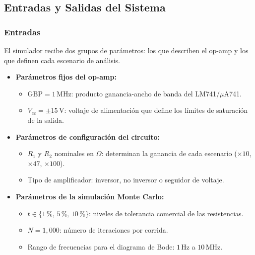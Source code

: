 ﻿\documentclass[12pt, letterpaper]{article}
\begin{document}
\subsection{Entradas y Salidas del Sistema}

\subsubsection*{Entradas}

El simulador recibe dos grupos de parámetros: los que describen el op-amp y los
que definen cada escenario de análisis.

\begin{itemize}[leftmargin=2em]

    \item \textbf{Parámetros fijos del op-amp:}
          \begin{itemize}[leftmargin=2em]
              \item \(\mathrm{GBP} = 1\,\text{MHz}\): producto ganancia-ancho de
                    banda del LM741/\(\mu\)A741. %
              \item \(V_{cc} = \pm15\,\text{V}\): voltaje de alimentación que
                    define los límites de saturación de la salida.
          \end{itemize}

    \item \textbf{Parámetros de configuración del circuito:}
          \begin{itemize}[leftmargin=2em]
              \item \(R_1\) y \(R_2\) nominales en \(\Omega\): determinan la
                    ganancia de cada escenario (\(\times 10\), \(\times 47\),
                    \(\times 100\)).
              \item Tipo de amplificador: inversor, no inversor o seguidor de
                    voltaje.
          \end{itemize}

    \item \textbf{Parámetros de la simulación Monte Carlo:}
          \begin{itemize}[leftmargin=2em]
              \item \(t \in \{1\,\text{\%},\, 5\,\text{\%},\, 10\,\text{\%}\}\): niveles de tolerancia
                    comercial de las resistencias.
              \item \(N = 1{,}000\): número de iteraciones por corrida.
              \item Rango de frecuencias para el diagrama de Bode:
                    \(1\,\text{Hz}\) a \(10\,\text{MHz}\).
          \end{itemize}

\end{itemize}
\end{document}

